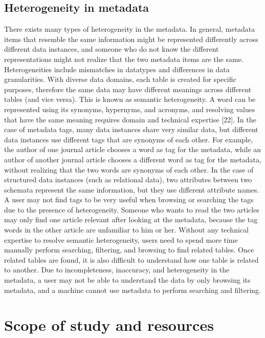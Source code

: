 \subsection{Heterogeneity in metadata}
There exists many types of heterogeneity in the metadata. In general, metadata items that resemble the same information might be represented differently across different data instances, and someone who do not know the different representations might not realize that the two metadata items are the same. Heterogeneities include mismatches in datatypes and differences in data granularities. With diverse data domains, each table is created for specific purposes, therefore the same data may have different meanings across different tables (and vice versa). This is known as semantic heterogeneity. A word can be represented using its synonyms, hypernyms, and acronyms, and resolving values that have the same meaning requires domain and technical expertise \cite{Halevy2005Why}[22].
In the case of metadata tags, many data instances share very similar data, but different data instances use different tags that are synonyms of each other. For example, the author of one journal article chooses a word as tag for the metadata, while an author of another journal article chooses a different word as tag for the metadata, without realizing that the two words are synonyms of each other. In the case of structured data instances (such as relational data), two attributes between two schemata represent the same information, but they use different attribute names.
A user may not find tags to be very useful when browsing or searching the tags due to the presence of heterogeneity. Someone who wants to read the two articles may only find one article relevant after looking at the metadata, because the tag words in the other article are unfamiliar to him or her. Without any technical expertise to resolve semantic heterogeneity, users need to
spend more time manually perform searching, filtering, and browsing to find related tables. Once related tables are found, it is also difficult to understand how one table is related to another.
Due to incompleteness, inaccuracy, and heterogeneity in the metadata, a user may not be able to understand the data by only browsing its metadata, and a machine cannot use metadata to perform searching and filtering.

\section{Scope of study and resources}
\label{sec:ScopeOfStudyAndResources}


